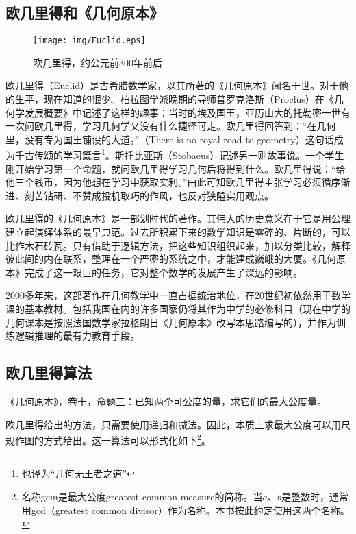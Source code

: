 \documentclass[UTF8]{article}
\begin{document}
\subsection{欧几里得和《几何原本》}

\begin{wrapfigure}{R}{0.4\textwidth}
 \centering
 \texttt{[image: img/Euclid.eps]}
 \captionsetup{labelformat=empty}
 \caption{欧几里得，约公元前300年前后}
 \label{fig:Euclid}
\end{wrapfigure}

欧几里得（Euclid）是古希腊数学家，以其所著的《几何原本》闻名于世。对于他的生平，现在知道的很少。柏拉图学派晚期的导师普罗克洛斯（Proclus）在《几何学发展概要》中记述了这样的趣事：当时的埃及国王，亚历山大的托勒密一世有一次问欧几里得，学习几何学又没有什么捷径可走。欧几里得回答到：“在几何里，没有专为国王铺设的大道。”（There is no royal road to geometry）这句话成为千古传颂的学习箴言\footnote{也译为“几何无王者之道”}。斯托比亚斯（Stobaeus）记述另一则故事说。一个学生刚开始学习第一个命题，就问欧几里得学习几何后将得到什么。欧几里得说：“给他三个钱币，因为他想在学习中获取实利。”由此可知欧几里得主张学习必须循序渐进、刻苦钻研、不赞成投机取巧的作风，也反对狭隘实用观点\cite{Elements}。

欧几里得的《几何原本》是一部划时代的著作。其伟大的历史意义在于它是用公理建立起演绎体系的最早典范。过去所积累下来的数学知识是零碎的、片断的，可以比作木石砖瓦。只有借助于逻辑方法，把这些知识组织起来，加以分类比较，解释彼此间的内在联系，整理在一个严密的系统之中，才能建成巍峨的大厦。《几何原本》完成了这一艰巨的任务，它对整个数学的发展产生了深远的影响。

2000多年来，这部著作在几何教学中一直占据统治地位，在20世纪初依然用于数学课的基本教材。包括我国在内的许多国家仍将其作为中学的必修科目（现在中学的几何课本是按照法国数学家拉格朗日《几何原本》改写本思路编写的），并作为训练逻辑推理的最有力教育手段\cite{HanXueTao16}。

\subsection{欧几里得算法}

\begin{proposition}
《几何原本》，卷十，命题三：已知两个可公度的量，求它们的最大公度量。
\end{proposition}

欧几里得给出的方法，只需要使用递归和减法。因此，本质上求最大公度可以用尺规作图的方式给出。这一算法可以形式化如下\footnote{名称gcm是最大公度greatest common measure的简称。当$a$、$b$是整数时，通常用gcd（greatest common divisor）作为名称。本书按此约定使用这两个名称。}。
\end{document}

